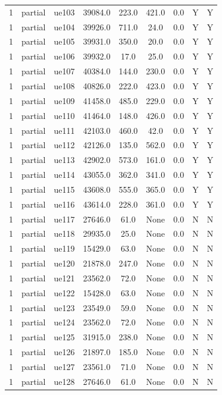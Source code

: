 \begin{table}[ht]
\begin{tabular}{|c|c|c|c|c|c|c|c|c|}
1 & partial & ue103 & 39084.0 & 223.0 & 421.0 & 0.0 & Y & Y \\
1 & partial & ue104 & 39926.0 & 711.0 & 24.0 & 0.0 & Y & Y \\
1 & partial & ue105 & 39931.0 & 350.0 & 20.0 & 0.0 & Y & Y \\
1 & partial & ue106 & 39932.0 & 17.0 & 25.0 & 0.0 & Y & Y \\
1 & partial & ue107 & 40384.0 & 144.0 & 230.0 & 0.0 & Y & Y \\
1 & partial & ue108 & 40826.0 & 222.0 & 423.0 & 0.0 & Y & Y \\
1 & partial & ue109 & 41458.0 & 485.0 & 229.0 & 0.0 & Y & Y \\
1 & partial & ue110 & 41464.0 & 148.0 & 426.0 & 0.0 & Y & Y \\
1 & partial & ue111 & 42103.0 & 460.0 & 42.0 & 0.0 & Y & Y \\
1 & partial & ue112 & 42126.0 & 135.0 & 562.0 & 0.0 & Y & Y \\
1 & partial & ue113 & 42902.0 & 573.0 & 161.0 & 0.0 & Y & Y \\
1 & partial & ue114 & 43055.0 & 362.0 & 341.0 & 0.0 & Y & Y \\
1 & partial & ue115 & 43608.0 & 555.0 & 365.0 & 0.0 & Y & Y \\
1 & partial & ue116 & 43614.0 & 228.0 & 361.0 & 0.0 & Y & Y \\
1 & partial & ue117 & 27646.0 & 61.0 & None & 0.0 & N & N \\
1 & partial & ue118 & 29935.0 & 25.0 & None & 0.0 & N & N \\
1 & partial & ue119 & 15429.0 & 63.0 & None & 0.0 & N & N \\
1 & partial & ue120 & 21878.0 & 247.0 & None & 0.0 & N & N \\
1 & partial & ue121 & 23562.0 & 72.0 & None & 0.0 & N & N \\
1 & partial & ue122 & 15428.0 & 63.0 & None & 0.0 & N & N \\
1 & partial & ue123 & 23549.0 & 59.0 & None & 0.0 & N & N \\
1 & partial & ue124 & 23562.0 & 72.0 & None & 0.0 & N & N \\
1 & partial & ue125 & 31915.0 & 238.0 & None & 0.0 & N & N \\
1 & partial & ue126 & 21897.0 & 185.0 & None & 0.0 & N & N \\
1 & partial & ue127 & 23561.0 & 71.0 & None & 0.0 & N & N \\
1 & partial & ue128 & 27646.0 & 61.0 & None & 0.0 & N & N \\

\end{tabular}
\end{table}
